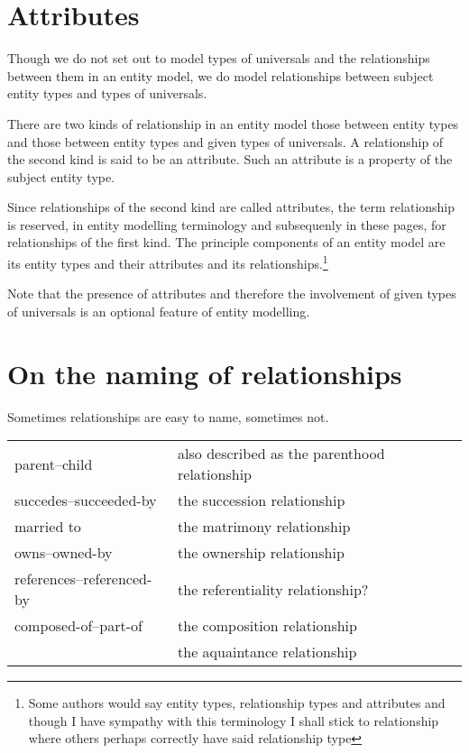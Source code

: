 \section{Attributes}
\mynote Though we do not set out to model types of universals and the relationships between them 
in an entity model, we do model relationships between subject entity types and types of universals. 

\mynote 
There are two kinds of relationship 
in an entity model those between entity types and those between 
entity types and  given types of universals. 
A relationship of the second kind is said to be an attribute. Such an attribute is a property of the subject entity type. 

\mynote Since relationships of the second kind are called attributes, the term relationship is reserved, in entity modelling terminology and subsequenly in these pages, for relationships of the first kind.  The principle components of an entity model are its entity types and their attributes and its relationships.\footnote{Some authors would say entity types, relationship types and attributes and though I have sympathy with this terminology I shall stick to relationship where others perhaps correctly have said relationship type}

\mynote
Note that the presence of attributes and therefore the involvement of given types of universals
is an optional feature of entity modelling. 

\section{On the naming of relationships}

\mynote Sometimes relationships are easy to name, sometimes not. 

\begin{center}
\begin{tabular} {| l | p{9cm} |}
\hline
parent--child & also described as the parenthood relationship\\
succedes--succeeded-by &  the succession relationship \\
married to             &  the matrimony relationship \\
owns--owned-by         & the ownership relationship\\
references--referenced-by & the referentiality relationship?\\
composed-of--part-of   &  the composition relationship\\
                       &  the aquaintance relationship\\
\hline
\end{tabular} 
\end{center}

